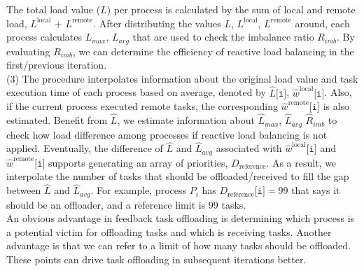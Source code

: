 The total load value ($L$) per process is calculated by the sum of local and remote load, $L^{\text{local}}$ $+$ $L^{\text{remote}}$. After distributing the values $L$, $L^{\text{local}}$, $L^{\text{remote}}$ around, each process calculates $L_{max}$, $L_{avg}$ that are used to check the imbalance ratio $R_{imb}$. By evaluating $R_{imb}$, we can determine the efficiency of reactive load balancing in the first/previous iteration.\\

(3) The procedure interpolates information about the original load value and task execution time of each process based on average, denoted by $\hat{L}\texttt{[i]}$, $\hat{w}^{\text{local}}\texttt{[i]}$. Also, if the current process executed remote tasks, the corresponding $\hat{w}^{\text{remote}}\texttt{[i]}$ is also estimated. Benefit from $\hat{L}$, we estimate information about $\hat{L}_{max}$, $\hat{L}_{avg}$ $\hat{R}_{imb}$ to check how load difference among processes if reactive load balancing is not applied. Eventually, the difference of $\hat{L}$ and $\hat{L}_{avg}$ associated with $\hat{w}^{\text{local}}\texttt{[i]}$ and $\hat{w}^{\text{remote}}\texttt{[i]}$ supports generating an array of priorities, $D_{\text{reference}}$. As a result, we interpolate the number of tasks that should be offloaded/received to fill the gap between $\hat{L}$ and $\hat{L}_{avg}$. For example, process $P_{i}$ has $D_{\text{reference}}\texttt{[i]} = 99$ that says it should be an offloader, and a reference limit is $99$ tasks.\\

An obvious advantage in feedback task offloading is determining which process is a potential victim for offloading tasks and which is receiving tasks. Another advantage is that we can refer to a limit of how many tasks should be offloaded. These points can drive task offloading in subsequent iterations better.





